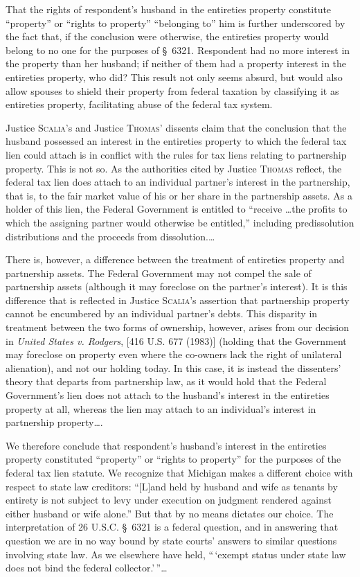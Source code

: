 That the rights of respondent's husband in the entireties property constitute
``property'' or ``rights to property'' ``belonging to'' him is further
underscored by the fact that, if the conclusion were otherwise, the entireties
property would belong to no one for the purposes of \S~6321. Respondent had
no more interest in the property than her husband; if neither of them had a
property interest in the entireties property, who did? This result not only
seems absurd, but would also allow spouses to shield their property from
federal taxation by classifying it as entireties property, facilitating abuse
of the federal tax system.

Justice \textsc{Scalia}'s and Justice \textsc{Thomas}' dissents claim that the
conclusion that the
husband possessed an interest in the entireties property to which the federal
tax lien could attach is in conflict with the rules for tax liens relating to
partnership property. This is not so. As the authorities cited by Justice
\textsc{Thomas} reflect, the federal tax lien does attach to an individual
partner's interest in the partnership, that is, to the fair market value of his
or her share in the partnership assets. As a holder of this lien, the Federal
Government is entitled to ``receive \dots the profits to which the assigning
partner would otherwise be entitled,'' including predissolution distributions
and the proceeds from dissolution.\ldots

There is, however, a difference between the treatment of entireties property and
partnership assets. The Federal Government may not compel the sale of
partnership assets (although it may foreclose on the partner's interest). It is
this difference that is reflected in Justice \textsc{Scalia}'s assertion that
partnership property cannot be encumbered by an individual partner's debts. This
disparity in treatment between the two forms of ownership, however, arises from
our decision in \emph{United States v. Rodgers}, [416 U.S. 677 (1983)] (holding
that the
Government may foreclose on property even where the co-owners lack the right of
unilateral alienation), and not our holding today. In this case, it is instead
the dissenters' theory that departs from partnership law, as it would hold that
the Federal Government's lien does not attach to the husband's interest in the
entireties property at all, whereas the lien may attach to an individual's
interest in partnership property\dots.

We therefore conclude that respondent's husband's interest in the entireties
property constituted ``property'' or ``rights to property'' for the purposes of
the federal tax lien statute. We recognize that Michigan makes a different
choice with respect to state law creditors: ``[L]and held by husband and wife
as tenants by entirety is not subject to levy under execution on judgment
rendered against either husband or wife alone.'' But that by no means dictates
our choice. The interpretation of 26 U.S.C. \S~6321 is a federal question,
and in answering that question we are in no way bound by state courts' answers
to similar questions involving state law. As we elsewhere have held,
``\,`exempt status under state law does not bind the federal
collector.'\,''\dots

